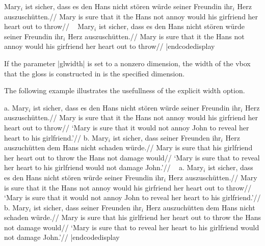 \framedisplay
\ex[exno={[(6), p. 14]}]
\begingl
\gla Mary$_i$ ist sicher, dass es den Hans nicht st\"oren w\"urde
seiner Freundin ihr$_i$ Herz auszusch\"utten.//
\glb Mary is sure that it the Hans not annoy would
his girfriend her heart {out to
throw}//
\endgl
\xe
\endframedisplay
\codedisplay~
\ex[exno={[(6), p. 14]}]
\begingl
\gla Mary$_i$ ist sicher, dass es den Hans nicht st\"oren w\"urde
seiner Freundin ihr$_i$ Herz auszusch\"utten.//
\glb Mary is sure that it the Hans not annoy would
his girfriend her heart {out to
throw}//
\endgl
\xe
|endcodedisplay

If the parameter |glwidth| is set to a nonzero dimension, the width of
the vbox that the gloss is constructed in is the specified dimension.

The following example illustrates the usefullness of the explicit
width option.

\ex
a.\quad
\begingl[glwidth=2.6in]
\gla Mary$_i$ ist sicher, dass es den Hans nicht st\"oren w\"urde
seiner Freundin ihr$_i$ Herz auszusch\"utten.//
\glb Mary is sure that it the Hans not annoy would
his girfriend her heart {out to
throw}//
\glft  `Mary is sure that it would not annoy John to reveal her
heart to his girlfriend.'//
\endgl
\hfil
b.\quad
\begingl[glwidth=2.6in]
\gla Mary$_i$ ist sicher, dass seiner Freunden ihr$_i$ Herz
auszuch\"utten dem Hans nicht schaden w\"urde.//
\glb Mary is sure that his girlfriend her
heart {out to throw} the Hans not damage would//
\glft `Mary is sure that to reveal her heart to his girlfriend
would not damage John.'//
\endgl
\xe
\codedisplay~
\ex
a.\quad
\begingl[glwidth=2.6in]
\gla Mary$_i$ ist sicher, dass es den Hans nicht st\"oren w\"urde
seiner Freundin ihr$_i$ Herz auszusch\"utten.//
\glb Mary is sure that it the Hans not annoy would
his girfriend her heart {out to
throw}//
\glft  `Mary is sure that it would not annoy John to reveal her
heart to his girlfriend.'//
\endgl
\hfil
b.\quad
\begingl[glwidth=2.6in]
\gla Mary$_i$ ist sicher, dass seiner Freunden ihr$_i$ Herz
auszuch\"utten dem Hans nicht schaden w\"urde.//
\glb Mary is sure that his girlfriend her
heart {out to throw} the Hans not damage would//
\glft `Mary is sure that to reveal her heart to his girlfriend
would not damage John.'//
\endgl
\xe
|endcodedisplay


